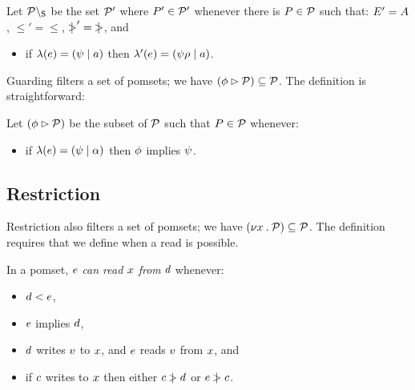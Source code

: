 \begin{definition}
Let $\mathcal{P}\setminus_{\mathsf{S}}$ be the set $\mathcal{P}'$ where $P'\in\mathcal{P}'$ whenever
there is $P\in\mathcal{P}$ such that:
$E' = A$,
${\le'} = {\le}$, 
${\mathrel{\,\mid\!\!\!>}'} = {\mathrel{\,\mid\!\!\!>}}$, and
\begin{itemize}
\item if $\lambda(e) = (\psi \mid a)$ then $\lambda'(e) =
  (\psi\rho \mid a)$.
\end{itemize}
\end{definition}

Guarding filters a set of pomsets; we have
$(\phi\mathbin\rhd\mathcal{P})\subseteq\mathcal{P}$.
The definition is straightforward:
\begin{definition}
Let $(\phi \mathbin\rhd \mathcal{P})$ be the subset of $\mathcal{P}$ such that $P\in\mathcal{P}$ whenever:
\begin{itemize}
\item if $\lambda(e) = (\psi \mid \alpha)$ then $\phi$ implies $\psi$.
\end{itemize}
\end{definition}




\subsection{Restriction}
\label{sec:restriction}

Restriction also filters a set of pomsets; we have
$(\nu x\mathbin.\mathcal{P})\subseteq\mathcal{P}$.  The definition requires that we define
when a read is possible.

\begin{definition}\label{def:rf}
  In a pomset, $e$ \emph{can read $x$ from} $d$ whenever: 
  \begin{itemize}
  \item $d < e$,
  \item $e$ implies $d$,
  \item $d$ writes $v$ to $x$,
    and $e$ reads $v$ from $x$, and
  \item if $c$ writes to $x$
    then either $c \mathrel{\,\mid\!\!\!>} d$ or $e \mathrel{\,\mid\!\!\!>} c$.
  \end{itemize}
\end{definition}

